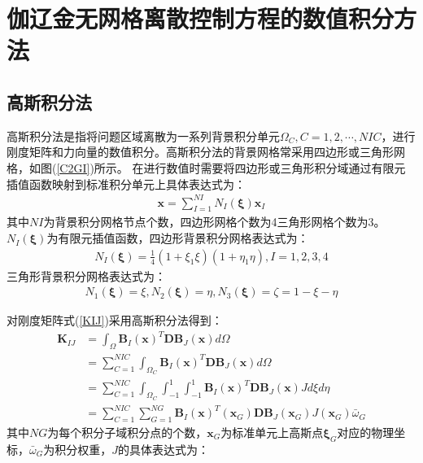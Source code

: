 \section{伽辽金无网格离散控制方程的数值积分方法}
\subsection{高斯积分法}
高斯积分法是指将问题区域离散为一系列背景积分单元$\Omega_C,C=1,2,\dotsb,N\!I\!C$，进行刚度矩阵和力向量的数值积分。高斯积分法的背景网格常采用四边形或三角形网格，如图(\ref{C2GI})所示。
在进行数值时需要将四边形或三角形积分域通过有限元插值函数映射到标准积分单元上具体表达式为：
\begin{equation}
\begin{split}
    \pmb{x}=\sum_{I=1}^{N\!I}N_I(\pmb{\xi})\pmb{x}_I
\end{split}
\end{equation}
其中$N\!I$为背景积分网格节点个数，四边形网格个数为4三角形网格个数为3。$N_I(\pmb{\xi})$为有限元插值函数，四边形背景积分网格表达式为：
\begin{equation}
\begin{split}
    N_I(\pmb{\xi})=\frac{1}{4}(1+\xi_1\xi)(1+\eta_1\eta),I=1,2,3,4
\end{split}
\end{equation}
三角形背景积分网格表达式为：
\begin{equation}
\begin{split}
    N_1(\pmb{\xi})=\xi,N_2(\pmb{\xi})=\eta,N_3(\pmb{\xi})=\zeta=1-\xi-\eta    
\end{split}
\end{equation}\par
对刚度矩阵式(\ref{KIJ})采用高斯积分法得到：
\begin{equation}
\begin{split}
    \pmb{K}_{IJ}&=\int_{\Omega}\pmb{B}_I(\pmb{x})^T\pmb{D}\pmb{B}_J(\pmb{x})d\Omega\\
     &=\sum_{C=1}^{N\!I\!C}\int_{\Omega_C}\pmb{B}_I(\pmb{x})^T\pmb{D}\pmb{B}_J(\pmb{x})d\Omega\\
     &=\sum_{C=1}^{N\!I\!C}\int_{\Omega_C}\int_{-1}^1\int_{-1}^1\pmb{B}_I(\pmb{x})^T\pmb{D}\pmb{B}_J(\pmb{x})Jd\xi d\eta\\
     &=\sum_{C=1}^{N\!I\!C}\sum_{G=1}^{N\!G}\pmb{B}_I(\pmb{x})^T(\pmb{x}_G)\pmb{D}\pmb{B}_J(\pmb{x}_G)J(\pmb{x}_G)\bar{\omega}_G
\end{split}
\end{equation}
其中$N\!G$为每个积分子域积分点的个数，$\pmb{x}_G$为标准单元上高斯点$\pmb{\xi}_G$对应的物理坐标，$\bar{\omega}_G$为积分权重，$J$的具体表达式为：
